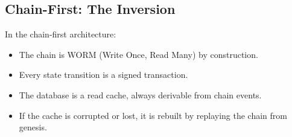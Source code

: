 \subsection{Chain-First: The Inversion}

In the chain-first architecture:

\begin{itemize}[nosep]
  \item The chain is WORM (Write Once, Read Many) by construction.
  \item Every state transition is a signed transaction.
  \item The database is a read cache, always derivable from chain
        events.
  \item If the cache is corrupted or lost, it is rebuilt by replaying
        the chain from genesis.
\end{itemize}

